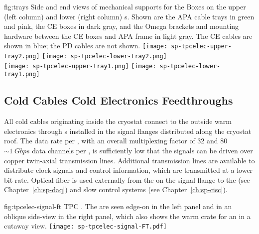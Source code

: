 \begin{dunefigure}
{fig:trays}
{Side and end views of mechanical supports for the  
Boxes on the upper (left column) and lower (right column) 
s. Shown are the APA cable trays in green and pink, 
the CE boxes in dark gray, and the Omega brackets and mounting 
hardware between the CE boxes and APA frame in light gray.  
The CE cables are shown in blue; the PD cables are not shown.}
\texttt{[image: sp-tpcelec-upper-tray2.png]}
\hspace{5mm}
\texttt{[image: sp-tpcelec-lower-tray2.png]} \\
\texttt{[image: sp-tpcelec-upper-tray1.png]}
\hspace{5mm}
\texttt{[image: sp-tpcelec-lower-tray1.png]}
\end{dunefigure}



\subsection{Cold Cables Cold Electronics Feedthroughs}
\label{sec:fdsp-tpcelec-design-ft}

All cold cables originating inside the cryostat connect to the outside 
warm electronics through  \fdth{}s installed in the signal 
flanges distributed along the cryostat roof. The  data rate 
per , with an overall multiplexing factor of \num{32} and 
\num{80} $\sim\SI{1}{Gbps}$ data channels per , is 
sufficiently low that the  signals can be driven over 
copper twin-axial transmission lines. Additional transmission lines 
are available to distribute  clock signals and  
control information, which are transmitted at a lower bit rate.
Optical fiber is used externally from the  on the signal 
flange to the  (see Chapter~\ref{ch:sp-daq}) and slow 
control systems (see Chapter~\ref{ch:sp-cisc}).

\begin{dunefigure}
{fig:tpcelec-signal-ft}
{TPC  \fdth. The  are seen edge-on in the left 
panel and in an oblique side-view in the right panel, which also shows 
the warm crate for an  in a cutaway view.}
\texttt{[image: sp-tpcelec-signal-FT.pdf]}
\end{dunefigure}

